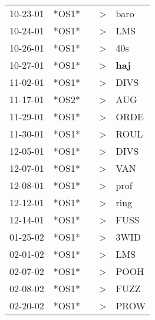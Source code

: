 \begin{supertabular}{p{0.07\textwidth}p{0.06\textwidth}p{0.02\textwidth}p{0.02\textwidth}p{0.06\textwidth}}
          10-23-01\textsuperscript{} &  *OS1* &   &     \textgreater &           baro\textsuperscript{} \\
          10-24-01\textsuperscript{} &  *OS1* &   &     \textgreater &            LMS\textsuperscript{} \\
          10-26-01\textsuperscript{} &  *OS1* &   &     \textgreater &            40s\textsuperscript{} \\
          10-27-01\textsuperscript{} &  *OS1* &   &     \textgreater &   \textbf{haj\textsuperscript{}} \\
          11-02-01\textsuperscript{} &  *OS1* &   &     \textgreater &           DIVS\textsuperscript{} \\
          11-17-01\textsuperscript{} &  *OS2* &   &     \textgreater &            AUG\textsuperscript{} \\
          11-29-01\textsuperscript{} &  *OS1* &   &     \textgreater &           ORDE\textsuperscript{} \\
          11-30-01\textsuperscript{} &  *OS1* &   &     \textgreater &           ROUL\textsuperscript{} \\
          12-05-01\textsuperscript{} &  *OS1* &   &     \textgreater &           DIVS\textsuperscript{} \\
          12-07-01\textsuperscript{} &  *OS1* &   &     \textgreater &            VAN\textsuperscript{} \\
          12-08-01\textsuperscript{} &  *OS1* &   &     \textgreater &           prof\textsuperscript{} \\
          12-12-01\textsuperscript{} &  *OS1* &   &     \textgreater &           ring\textsuperscript{} \\
          12-14-01\textsuperscript{} &  *OS1* &   &     \textgreater &           FUSS\textsuperscript{} \\
          01-25-02\textsuperscript{} &  *OS1* &   &     \textgreater &           3WID\textsuperscript{} \\
          02-01-02\textsuperscript{} &  *OS1* &   &     \textgreater &            LMS\textsuperscript{} \\
          02-07-02\textsuperscript{} &  *OS1* &   &     \textgreater &           POOH\textsuperscript{} \\
          02-08-02\textsuperscript{} &  *OS1* &   &     \textgreater &           FUZZ\textsuperscript{} \\
          02-20-02\textsuperscript{} &  *OS1* &   &     \textgreater &           PROW\textsuperscript{} \\

\end{supertabular}

